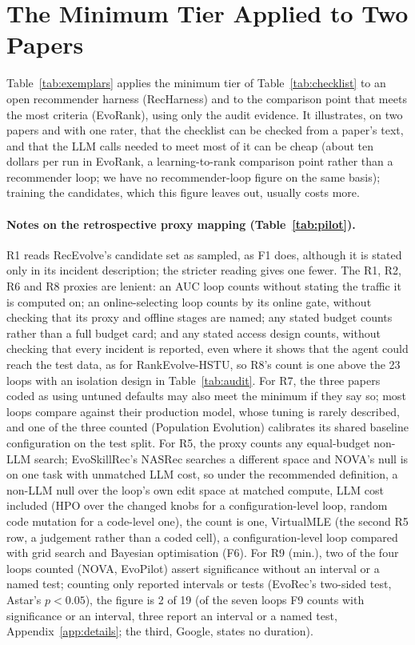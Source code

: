\documentclass[sigconf,nonacm]{acmart}
\begin{document}
\appendix

\section{The Minimum Tier Applied to Two Papers}\label{app:exemplars}

Table~\ref{tab:exemplars} applies the minimum tier of Table~\ref{tab:checklist} to an open recommender harness
(RecHarness) and to the comparison point that meets the most criteria (EvoRank), using only the audit evidence. It
illustrates, on two papers and with one rater, that the checklist can be checked from a paper's text, and that the LLM calls needed to meet most of it can be cheap (about ten dollars per run in EvoRank, a learning-to-rank comparison point rather than a recommender loop; we have no recommender-loop figure on the same basis); training the candidates, which this figure leaves out, usually costs more.

\paragraph{Notes on the retrospective proxy mapping (Table~\ref{tab:pilot}).} R1 reads RecEvolve's candidate set as sampled, as F1 does, although it is stated only in its incident description; the stricter reading gives one fewer. The R1, R2, R6 and R8 proxies are lenient: an AUC loop counts without stating the traffic it is computed on; an online-selecting loop counts by its online gate, without checking that its proxy and offline stages are named; any stated budget counts rather than a full budget card; and any stated access design counts, without checking that every incident is reported, even where it shows that the agent could reach the test data, as for RankEvolve-HSTU, so R8's count is one above the 23 loops with an isolation design in Table~\ref{tab:audit}. For R7, the three papers coded as using untuned defaults may also meet the minimum if they say so; most loops compare against their production model, whose tuning is rarely described, and one of the three counted (Population Evolution) calibrates its shared baseline configuration on the test split. For R5, the proxy counts any equal-budget non-LLM search; EvoSkillRec's NASRec searches a different space and NOVA's null is on one task with unmatched LLM cost, so under the recommended definition, a non-LLM null over the loop's own edit space at matched compute, LLM cost included (HPO over the changed knobs for a configuration-level loop, random code mutation for a code-level one), the count is one, VirtualMLE (the second R5 row, a judgement rather than a coded cell), a configuration-level loop compared with grid search and Bayesian optimisation (F6). For R9 (min.), two of the four loops counted (NOVA, EvoPilot) assert significance without an interval or a named test; counting only reported intervals or tests (EvoRec's two-sided test, Astar's $p<0.05$), the figure is 2 of 19 (of the seven loops F9 counts with significance or an interval, three report an interval or a named test, Appendix~\ref{app:details}; the third, Google, states no duration).
\end{document}
